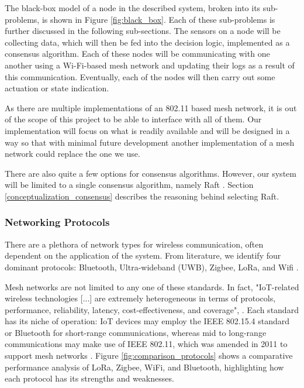 The black-box model of a node in the described system, broken into its sub-problems, is shown in Figure \ref{fig:black_box}. Each of these sub-problems is further discussed in the following sub-sections. The sensors on a node will be collecting data, which will then be fed into the decision logic, implemented as a consensus algorithm. Each of these nodes will be communicating with one another using a Wi-Fi-based mesh network and updating their logs as a result of this communication. Eventually, each of the nodes will then carry out some actuation or state indication.

As there are multiple implementations of an 802.11 based mesh network, it is out of the scope of this project to be able to interface with all of them. Our implementation will focus on what is readily available and will be designed in a way so that with minimal future development another implementation of a mesh network could replace the one we use.

There are also quite a few options for consensus algorithms. However, our system will be limited to a single consensus algorithm, namely Raft \cite{raft_paper}. Section \ref{conceptualization_consensus} describes the reasoning behind selecting Raft.


\subsubsection{Networking Protocols}
There are a plethora of network types for wireless communication, often dependent on the application of the system. From literature, we identify four dominant protocols: Bluetooth, Ultra-wideband (UWB), Zigbee, LoRa, and Wifi \cite{lee2007comparative, ti_lethaby2017wireless}.

Mesh networks are not limited to any one of these standards. In fact, "IoT-related wireless technologies [...] are extremely heterogeneous in terms of protocols, performance, reliability, latency, cost-effectiveness, and coverage",  \cite{iot_survey_cilfone2019wireless}. Each standard has its niche of operation: IoT devices may employ the IEEE 802.15.4 standard or Bluetooth for short-range communications, whereas mid to long-range communications may make use of IEEE 802.11, which was amended in 2011 to support mesh networks \cite{ti_lethaby2017wireless, iot_survey_cilfone2019wireless}. Figure \ref{fig:comparison_protocols} shows a comparative performance analysis of LoRa, Zigbee, WiFi, and Bluetooth, highlighting how each protocol has its strengths and weaknesses.


